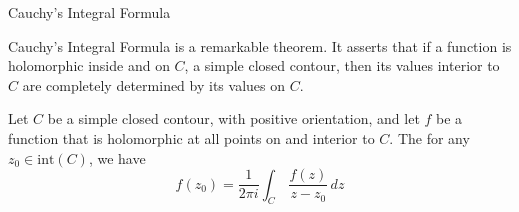 \vspace*{1em}

\begin{mdframed}
\begin{center}
{\Large Cauchy's Integral Formula}
\end{center}
\end{mdframed}

\begin{discussion}
Cauchy's Integral Formula is a remarkable theorem. It asserts that if a function is holomorphic inside and on $C$, a simple closed contour, then its values interior to $C$ are completely determined by its values on $C$. 
\end{discussion}

\vspace*{1em}

\begin{theorem}\label{cintform}
Let $C$ be a simple closed contour, with positive orientation, and let $f$ be a function that is holomorphic at all points on and interior to $C$. The for any $z_0 \in \mathrm{int}(C)$, we have
\[f(z_0) = \frac{1}{2\pi i}\int_C\,\frac{f(z)}{z - z_0}\,dz\]
\end{theorem}
